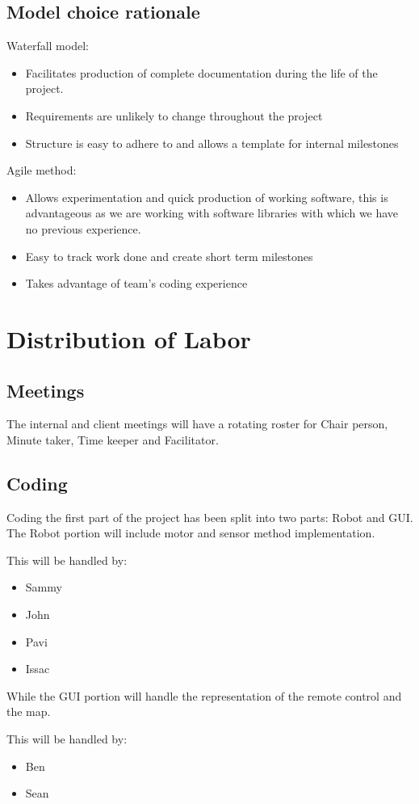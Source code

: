 \documentclass[11pt, letterpaper]{article}
\begin{document}
\subsection{Model choice rationale}
Waterfall model: 
\begin{itemize}
\item Facilitates production of complete documentation during the life of the project.
\item Requirements are unlikely to change throughout the project
\item Structure is easy to adhere to and allows a template for internal milestones
\end{itemize}
Agile method: 
\begin{itemize}
\item Allows experimentation and quick production of working software, 
this is advantageous as we are working with software libraries with which we
 have no previous experience.
\item Easy to track work done and create short term milestones
\item Takes advantage of team's coding experience
\end{itemize}

\section{Distribution of Labor}
\subsection{Meetings}
The internal and client meetings will have a rotating roster for Chair person, Minute taker, 
Time keeper and Facilitator.
\subsection{Coding}
Coding the first part of the project has been split into two parts: Robot and GUI.
The Robot portion will include motor and sensor method implementation. 
\par This will be handled by:
\begin{itemize}
\item Sammy
\item John
\item Pavi
\item Issac
\end{itemize}
While the GUI portion will handle the representation of the remote control and the map.\par
This will be handled by:
\begin{itemize}
\item Ben
\item Sean
\end{itemize}
\end{document}
